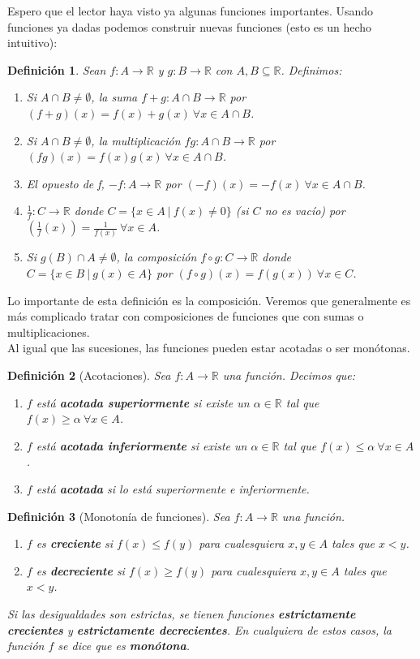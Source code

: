 \documentclass{article}
\newtheorem{define}{Definición}
\newcommand{\reales}{\mathbb{R}}
\begin{document}
Espero que el lector haya visto ya algunas funciones importantes. Usando funciones ya dadas podemos construir nuevas funciones (esto es un hecho intuitivo):
\begin{define}
	Sean $f:A \rightarrow \reales$ y $g:B \rightarrow \reales$ con $A,B \subseteq \reales$. Definimos:
	\begin{enumerate}
		\item
		Si $A \cap B \neq \emptyset$, la suma $f + g : A \cap B \rightarrow \reales$ por $(f + g)(x) = f(x) + g(x)\ \forall x \in A \cap B$.
		\item
		Si $A \cap B \neq \emptyset$, la multiplicación $fg : A \cap B \rightarrow \reales$ por $(fg)(x) = f(x)g(x)\ \forall x \in A \cap B$.
		\item
		El opuesto de f, $-f: A \rightarrow \reales$ por $(-f)(x) = -f(x)\ \forall x \in A \cap B$.
		\item
		$\frac{1}{f}: C \rightarrow \reales$ donde $C = \{x \in A\ |\ f(x) \neq 0\}$ (si $C$ no es vacío) por $(\frac{1}{f}(x)) = \frac{1}{f(x)}\ \forall x \in A$.
		\item
		Si $g(B) \cap A \neq \emptyset$, la composición $f \circ g : C \rightarrow \reales$ donde $C = \{x \in B\ |\ g(x) \in A\}$ por $(f \circ g)(x) = f(g(x))\ \forall x \in C$.
	\end{enumerate}
\end{define}
Lo importante de esta definición es la composición. Veremos que generalmente es más complicado tratar con composiciones de funciones que con sumas o multiplicaciones.\\
Al igual que las sucesiones, las funciones pueden estar acotadas o ser monótonas.
\begin{define}[Acotaciones]
	Sea $f:A \rightarrow \reales$ una función. Decimos que:
	\begin{enumerate}
		\item
		$f$ está \textbf{acotada superiormente} si existe un $\alpha \in \reales$ tal que $f(x) \geq \alpha\ \forall x \in A$.
		\item
		$f$ está \textbf{acotada inferiormente} si existe un $\alpha \in \reales$ tal que $f(x) \leq \alpha\ \forall x \in A$.
		\item
		$f$ está \textbf{acotada} si lo está superiormente e inferiormente.
	\end{enumerate}
\end{define}

\begin{define}[Monotonía de funciones]
	Sea $f:A \rightarrow \reales$ una función.
	\begin{enumerate}
		\item
		$f$ es \textbf{creciente} si $f(x) \leq f(y)$ para cualesquiera $x,y \in A$ tales que $x < y$.
		\item
		$f$ es \textbf{decreciente} si $f(x) \geq f(y)$ para cualesquiera $x,y \in A$ tales que $x < y$.
	\end{enumerate}
	Si las desigualdades son estrictas, se tienen funciones \textbf{estrictamente crecientes} y \textbf{estrictamente decrecientes}. En cualquiera de estos casos, la función $f$ se dice que es \textbf{monótona}.
\end{define}
\end{document}
